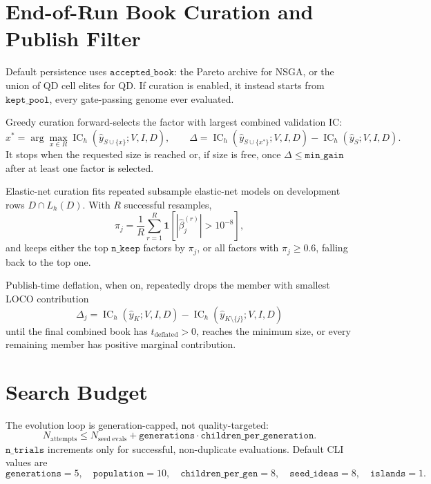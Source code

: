 \documentclass[11pt]{article}
\newcommand{\IC}{\operatorname{IC}}
\newcommand{\ind}{\mathbf{1}}
\begin{document}
\section*{End-of-Run Book Curation and Publish Filter}

Default persistence uses \(\texttt{accepted\_book}\): the Pareto archive for NSGA,
or the union of QD cell elites for QD.  If curation is enabled, it instead starts
from \(\texttt{kept\_pool}\), every gate-passing genome ever evaluated.

Greedy curation forward-selects the factor with largest combined validation IC:
\[
  x^*=\arg\max_{x\in R}\IC_h(\widehat y_{S\cup\{x\}};V,I,D),
  \qquad
  \Delta=\IC_h(\widehat y_{S\cup\{x^*\}};V,I,D)-\IC_h(\widehat y_S;V,I,D).
\]
It stops when the requested size is reached or, if size is free, once
\(\Delta\le\texttt{min\_gain}\) after at least one factor is selected.

Elastic-net curation fits repeated subsample elastic-net models on development
rows \(D\cap L_h(D)\).  With \(R\) successful resamples,
\[
  \pi_j=\frac{1}{R}\sum_{r=1}^{R}\ind[|\widehat\beta^{(r)}_j|>10^{-8}],
\]
and keeps either the top \(\texttt{n\_keep}\) factors by \(\pi_j\), or all
factors with \(\pi_j\ge 0.6\), falling back to the top one.

Publish-time deflation, when on, repeatedly drops the member with smallest LOCO
contribution
\[
  \Delta_j=
  \IC_h(\widehat y_K;V,I,D)
  -
  \IC_h(\widehat y_{K\setminus\{j\}};V,I,D)
\]
until the final combined book has \(t_{\mathrm{deflated}}>0\), reaches the
minimum size, or every remaining member has positive marginal contribution.

\section*{Search Budget}

The evolution loop is generation-capped, not quality-targeted:
\[
  N_{\mathrm{attempts}}
  \le
  N_{\mathrm{seed\ evals}}
  +
  \texttt{generations}\cdot\texttt{children\_per\_generation}.
\]
\(\texttt{n\_trials}\) increments only for successful, non-duplicate evaluations.
Default CLI values are
\[
  \texttt{generations}=5,\quad
  \texttt{population}=10,\quad
  \texttt{children\_per\_gen}=8,\quad
  \texttt{seed\_ideas}=8,\quad
  \texttt{islands}=1.
\]
\end{document}
